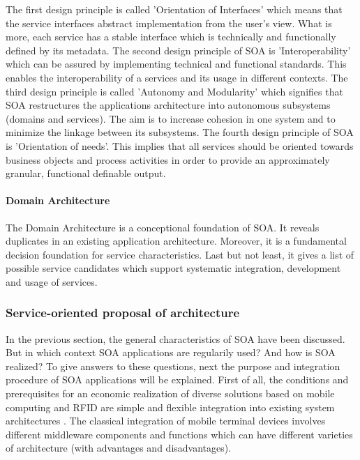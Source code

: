 The first design principle is called 'Orientation of Interfaces' which means that the service interfaces abstract implementation from the user's view. What is more, each service has a stable interface which is technically and functionally defined by its metadata. The second design principle of SOA is 'Interoperability' which can be assured by implementing technical and functional standards. This enables the interoperability of a services and its usage in different contexts. The third design principle is called 'Autonomy and Modularity' which signifies that SOA restructures the applications architecture into autonomous subsystems (domains and services). The aim is to increase cohesion in one system and to minimize the linkage between its subsystems. The fourth design principle of SOA is 'Orientation of needs'. This implies that all services should be oriented towards business objects and process activities in order to provide an approximately granular, functional definable output. 

\paragraph{Domain Architecture}

The Domain Architecture is a conceptional foundation of SOA. It reveals duplicates in an existing application architecture. Moreover, it is a fundamental decision foundation for service characteristics. Last but not least, it gives a list of possible service candidates which support systematic integration, development and usage of services.

\subsubsection{Service-oriented proposal of architecture}

In the previous section, the general characteristics of SOA have been discussed. But in which context SOA applications are regularily used? And how is SOA realized? To give answers to these questions, next the purpose and integration procedure of SOA applications will be explained. 
First of all, the conditions and prerequisites for an economic realization of diverse solutions based on mobile computing and RFID are simple and flexible integration into existing system architectures \cite[p.133 ff.]{mobile}. The classical integration of mobile terminal devices involves different middleware components and functions which can have different varieties of architecture (with advantages and disadvantages). 


